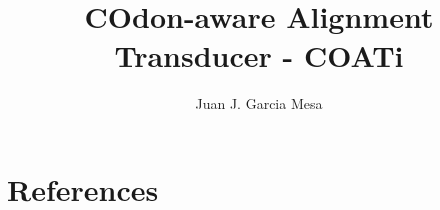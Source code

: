 

\title{COdon-aware Alignment Transducer - COATi}
\author{Juan J. Garcia Mesa}
\date{}


\maketitle




\vspace{2em}






%





\section{References}


